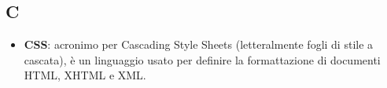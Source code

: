\subsection{C}
\begin{itemize}
	\item \textbf{CSS}: acronimo per Cascading Style Sheets (letteralmente fogli di stile a cascata), è un linguaggio usato per definire la formattazione di documenti HTML, XHTML e XML.
\end{itemize}